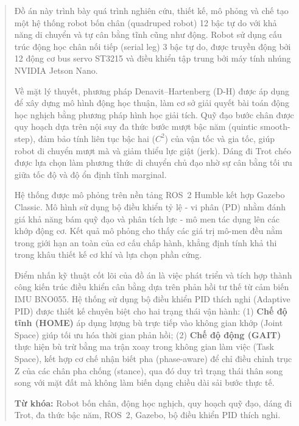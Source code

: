 \documentclass[13pt,a4paper,oneside]{extbook}
\begin{document}
\begin{abstract}

Đồ án này trình bày quá trình nghiên cứu, thiết kế, mô phỏng và chế tạo một hệ thống robot bốn chân (quadruped robot) 12 bậc tự do với khả năng di chuyển và tự cân bằng tĩnh cũng như động. Robot sử dụng cấu trúc động học chân nối tiếp (serial leg) 3 bậc tự do, được truyền động bởi 12 động cơ bus servo ST3215 và điều khiển tập trung bởi máy tính nhúng NVIDIA Jetson Nano.

Về mặt lý thuyết, phương pháp Denavit--Hartenberg (D-H) được áp dụng để xây dựng mô hình động học thuận, làm cơ sở giải quyết bài toán động học nghịch bằng phương pháp hình học giải tích. Quỹ đạo bước chân được quy hoạch dựa trên nội suy đa thức bước mượt bậc năm (quintic smooth-step), đảm bảo tính liên tục bậc hai ($C^2$) của vận tốc và gia tốc, giúp robot di chuyển mượt mà và giảm thiểu lực giật (jerk). Dáng đi Trot chéo được lựa chọn làm phương thức di chuyển chủ đạo nhờ sự cân bằng tối ưu giữa tốc độ và độ ổn định tĩnh marginal.

Hệ thống được mô phỏng trên nền tảng ROS~2 Humble kết hợp Gazebo Classic. Mô hình sử dụng bộ điều khiển tỷ lệ - vi phân (PD) nhằm đánh giá khả năng bám quỹ đạo và phân tích lực - mô men tác dụng lên các khớp động cơ. Kết quả mô phỏng cho thấy các giá trị mô-men đều nằm trong giới hạn an toàn của cơ cấu chấp hành, khẳng định tính khả thi trong khâu thiết kế cơ khí và lựa chọn phần cứng.

Điểm nhấn kỹ thuật cốt lõi của đồ án là việc phát triển và tích hợp thành công kiến trúc điều khiển cân bằng dựa trên phản hồi tư thế từ cảm biến IMU BNO055. Hệ thống sử dụng bộ điều khiển PID thích nghi (Adaptive PID) được thiết kế chuyên biệt cho hai trạng thái vận hành: (1) \textbf{Chế độ tĩnh (HOME)} áp dụng lượng bù trực tiếp vào không gian khớp (Joint Space) giúp tối ưu hóa thời gian phản hồi; (2) \textbf{Chế độ động (GAIT)} thực hiện bù trừ bằng ma trận xoay trong không gian làm việc (Task Space), kết hợp cơ chế nhận biết pha (phase-aware) để chỉ điều chỉnh trục Z của các chân pha chống (stance), qua đó duy trì trạng thái thân song song với mặt đất mà không làm biến dạng chiều dài sải bước thực tế.

\vspace{0.5cm}
\noindent\textbf{Từ khóa:} Robot bốn chân, động học nghịch, quy hoạch quỹ đạo, dáng đi Trot, đa thức bậc năm, ROS~2, Gazebo, bộ điều khiển PID thích nghi.

\end{abstract}
\end{document}
